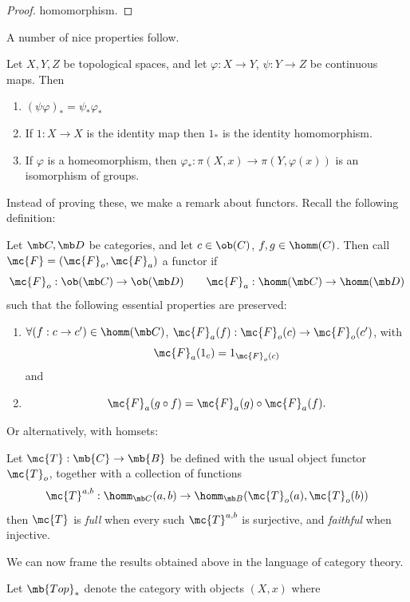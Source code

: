 \documentclass{fkbook}
\theoremstyle{snazzydefinition}
\begin{document}
\begin{adjustwidth}{1em}{1em}
\begin{proof}
    homomorphism.
  \end{proof}
  A number of nice properties follow.
  \begin{theorem}
    Let $X,Y,Z$ be topological spaces, and let $\varphi : X \to Y$,
    $\psi : Y \to Z$ be continuous maps. Then
    \begin{enumerate}[label=\arabic*)]
      \item $(\psi \varphi)_* = \psi_* \varphi_*$
      \item If $1 : X \to X$ is the identity map then $1_*$ is the
        identity homomorphism.
      \item If $\varphi$ is a homeomorphism, then $\varphi_* :
        \pi(X,x) \to \pi(Y, \varphi(x))$ is an isomorphism of groups.
    \end{enumerate}
  \end{theorem}
  Instead of proving these, we make a remark about functors. Recall
  the following definition:
  \begin{definition}[Functor]
    Let $\mb C, \mb D$ be categories, and let $c \in \ob(C)$, $f,g \in
    \homm(C)$. Then call $\mc{F} = (\mc{F}_o, \mc{F}_a)$ a functor if
    \[
      \mc{F}_o : \ob(\mb C) \to \ob(\mb D) \qquad \mc{F}_a : \homm(\mb
      C) \to \homm(\mb D)
    \]
    such that the following essential properties are preserved:
    \begin{enumerate}
    \item $\forall (f : c \to c') \in \homm(\mb C)$, $\mc{F}_a(f) :
      \mc{F}_o(c) \to \mc{F}_o(c')$, with
      \[
        \mc{F}_a(1_{c}) = 1_{\mc{F}_o(c)}
      \]
      and
    \item
      \[
        \mc{F}_a(g \circ f) = \mc{F}_a(g) \circ \mc{F}_a(f).
      \]
    \end{enumerate}
  \end{definition}
  Or alternatively, with homsets:
  \begin{definition}
    Let $\mc{T} : \mb{C} \to \mb{B}$ be defined with the usual object
    functor $\mc{T}_o$, together with a collection of functions
    \[
      \mc{T}^{a,b} : \homm_{\mb C}(a,b) \to \homm_{\mb B}(\mc{T}_o(a),
      \mc{T}_o(b))
    \]
    then $\mc{T}$ is \emph{full} when every such $\mc{T}^{a,b}$ is
    surjective, and \emph{faithful} when injective.
  \end{definition}
  We can now frame the results obtained above in the language of
  category theory.
  \begin{theorem}
    Let $\mb{Top}_*$ denote the category with objects $(X,x)$ where

\end{theorem}
\end{adjustwidth}
\end{document}
